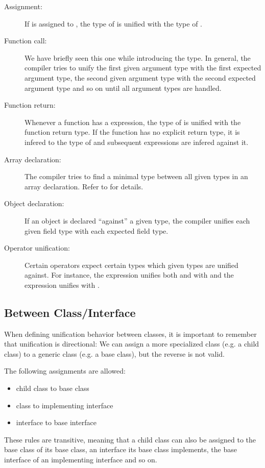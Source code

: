 \documentclass{haxe}
\begin{document}
\begin{description}
	\item[Assignment:] If  is assigned to , the type of  is unified with the type of .
	\item[Function call:] We have briefly seen this one while introducing the  type. In general, the compiler tries to unify the first given argument type with the first expected argument type, the second given argument type with the second expected argument type and so on until all argument types are handled.
	\item[Function return:] Whenever a function has a  expression, the type of  is unified with the function return type. If the function has no explicit return type, it is infered to the type of  and subsequent  expressions are infered against it.
	\item[Array declaration:] The compiler tries to find a minimal type between all given types in an array declaration. Refer to  for details.
	\item[Object declaration:] If an object is declared ``against'' a given type, the compiler unifies each given field type with each expected field type.
	\item[Operator unification:] Certain operators expect certain types which given types are unified against. For instance, the expression  unifies both  and  with  and the expression  unifies  with .
\end{description}


\subsection{Between Class/Interface}
\label{type-system-unification-between-classes-and-interfaces}

When defining unification behavior between classes, it is important to remember that unification is directional: We can assign a more specialized class (e.g. a child class) to a generic class (e.g. a base class), but the reverse is not valid.

The following assignments are allowed:

\begin{itemize}
	\item child class to base class
	\item class to implementing interface
	\item interface to base interface
\end{itemize}
These rules are transitive, meaning that a child class can also be assigned to the base class of its base class, an interface its base class implements, the base interface of an implementing interface and so on.
\end{document}
